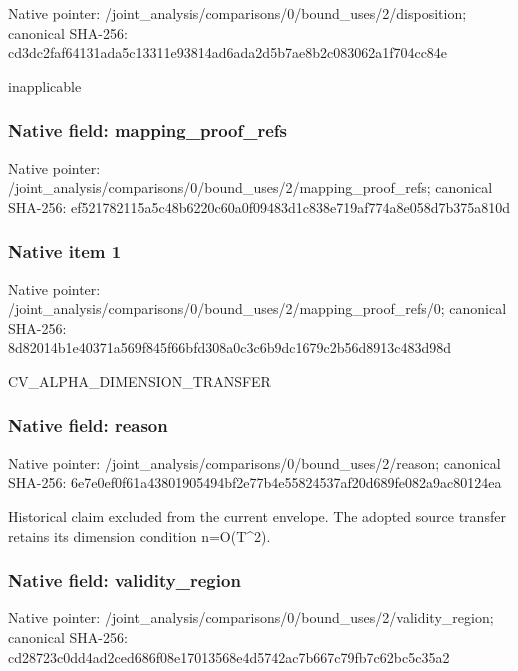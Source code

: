 \documentclass[10pt,a4paper]{article}
\begin{document}
Native pointer: /joint\_analysis/comparis\allowbreak{}ons/0/bound\_uses/2/dispo\allowbreak{}sition; canonical SHA-256: cd3dc2faf64131ada5c13311\allowbreak{}e93814ad6ada2d5b7ae8b2c0\allowbreak{}83062a1f704cc84e


inapplicable


\subsubsection{Native field: mapping\_proof\_refs}


Native pointer: /joint\_analysis/comparis\allowbreak{}ons/0/bound\_uses/2/mappi\allowbreak{}ng\_proof\_refs; canonical SHA-256: ef521782115a5c48b6220c60\allowbreak{}a0f09483d1c838e719af774a\allowbreak{}8e058d7b375a810d



\subsubsection{Native item 1}


Native pointer: /joint\_analysis/comparis\allowbreak{}ons/0/bound\_uses/2/mappi\allowbreak{}ng\_proof\_refs/0; canonical SHA-256: 8d82014b1e40371a569f845f\allowbreak{}66bfd308a0c3c6b9dc1679c2\allowbreak{}b56d8913c483d98d


CV\_ALPHA\_DIMENSION\_TRANSFER


\subsubsection{Native field: reason}


Native pointer: /joint\_analysis/comparis\allowbreak{}ons/0/bound\_uses/2/reaso\allowbreak{}n; canonical SHA-256: 6e7e0ef0f61a43801905494b\allowbreak{}f2e77b4e55824537af20d689\allowbreak{}fe082a9ac80124ea


Historical claim excluded from the current envelope. The adopted source transfer retains its dimension condition n=O(T\textasciicircum{}2).


\subsubsection{Native field: validity\_region}


Native pointer: /joint\_analysis/comparis\allowbreak{}ons/0/bound\_uses/2/valid\allowbreak{}ity\_region; canonical SHA-256: cd28723c0dd4ad2ced686f08\allowbreak{}e17013568e4d5742ac7b667c\allowbreak{}79fb7c62bc5c35a2
\end{document}
